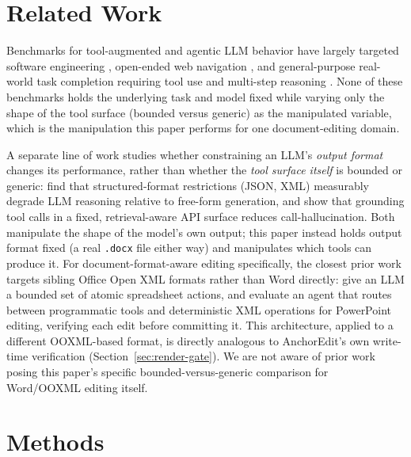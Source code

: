 \documentclass[11pt]{article}
\DeclareRobustCommand{\claim}[2]{#2}
\begin{document}
\section{Related Work}
\label{sec:related}

Benchmarks for tool-augmented and agentic LLM behavior have largely targeted software
engineering \citep{jimenez2023swebench}, open-ended web navigation \citep{zhou2024webarena}, and
general-purpose real-world task completion requiring tool use and multi-step reasoning
\citep{mialon2023gaia}. \claim{prior-benchmarks-fixed-tool-surface}{\claim{tool-surface-only-manipulated-variable}{None of these benchmarks holds the underlying task and model fixed while
varying only the shape of the tool surface (bounded versus generic) as the manipulated variable,
which is the manipulation this paper performs for one document-editing domain.}}

A separate line of work studies whether constraining an LLM's \emph{output format} changes its
performance, rather than whether the \emph{tool surface itself} is bounded or generic:
\citet{tam2024letmespeak} find that structured-format restrictions (JSON, XML) measurably degrade
LLM reasoning relative to free-form generation, and \citet{patil2023gorilla} show that grounding
tool calls in a fixed, retrieval-aware API surface reduces call-hallucination. Both manipulate the
shape of the model's own output; \claim{tool-surface-only-manipulated-variable}{this paper instead holds output format fixed (a real \texttt{.docx}
file either way) and manipulates which tools can produce it.} \claim{novelty-word-ooxml}{For document-format-aware editing
specifically, the closest prior work targets sibling Office Open XML formats rather than Word
directly:} \citet{li2023sheetcopilot} give an LLM a bounded set of atomic spreadsheet actions, and
\citet{ofengenden2025pptarena} evaluate an agent that routes between programmatic tools and
deterministic XML operations for PowerPoint editing, \claim{never-persist-corrupt-document}{verifying each edit before committing it.
This architecture, applied to a different OOXML-based format, is directly analogous to
AnchorEdit's own write-time verification (Section~\ref{sec:render-gate}).} \claim{novelty-word-ooxml}{We are not aware of
prior work posing this paper's specific bounded-versus-generic comparison for Word/OOXML editing
itself.}

\section{Methods}
\label{sec:methods}
\end{document}
